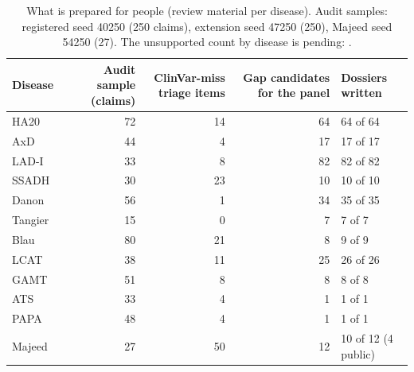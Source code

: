 \documentclass{article} %
\begin{document}
\begin{table}[!htbp]
\caption{What is prepared for people (review material per disease). Audit samples: registered seed 40250 (250 claims), extension seed 47250 (250), Majeed seed 54250 (27). The unsupported count by disease is pending: .}
\begin{center}
\scriptsize
\begin{tabular}{lrrrl}
\toprule
Disease & Audit sample (claims) & ClinVar-miss triage items & Gap candidates for the panel & Dossiers written \\
\midrule
HA20 & 72 & 14 & 64 & 64 of 64 \\
AxD & 44 & 4 & 17 & 17 of 17 \\
LAD-I & 33 & 8 & 82 & 82 of 82 \\
SSADH & 30 & 23 & 10 & 10 of 10 \\
Danon & 56 & 1 & 34 & 35 of 35 \\
Tangier & 15 & 0 & 7 & 7 of 7 \\
\midrule
Blau & 80 & 21 & 8 & 9 of 9 \\
LCAT & 38 & 11 & 25 & 26 of 26 \\
GAMT & 51 & 8 & 8 & 8 of 8 \\
ATS & 33 & 4 & 1 & 1 of 1 \\
PAPA & 48 & 4 & 1 & 1 of 1 \\
\midrule
Majeed & 27 & 50 & 12 & 10 of 12 (4 public) \\
\bottomrule
\end{tabular}
\end{center}
\end{table}
\end{document}
